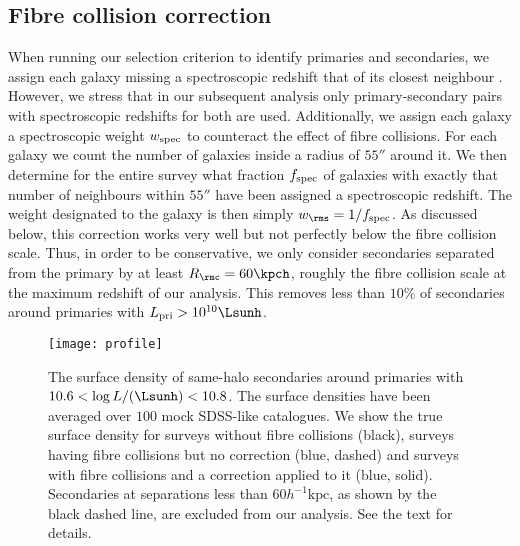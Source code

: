 \documentclass[fleqn,usenatbib,useAMS]{mnras}
\begin{document}
	\subsection{Fibre collision correction}
	\label{subsec:fibre_collisions}
	
	When running our selection criterion to identify primaries and secondaries, we assign each galaxy missing a spectroscopic redshift that of its closest neighbour \citep[see][]{Blanton+05, Zehavi+05}. However, we stress that in our subsequent analysis only primary-secondary pairs with spectroscopic redshifts for both are used. Additionally, we assign each galaxy a spectroscopic weight $w_{\rm spec}$ to counteract the effect of fibre collisions. For each galaxy we count the number of galaxies inside a radius of $55''$ around it. We then determine for the entire survey what fraction $f_{\rm spec}$ of galaxies with exactly that number of neighbours within $55''$ have been assigned a spectroscopic redshift. The weight designated to the galaxy is then simply $w_\rms = 1/f_{\rm spec}$. As discussed below, this correction works very well but not perfectly below the fibre collision scale. Thus, in order to be conservative, we only consider secondaries separated from the primary by at least $R_\rmc = 60 \kpch$, roughly the fibre collision scale at the maximum redshift of our analysis. This removes less than $10\%$ of secondaries around primaries with $L_{\rm pri} > 10^{10} \Lsunh$.
	\begin{figure}
		\centering
		\texttt{[image: profile]}
		\caption{The surface density of same-halo secondaries around primaries with $10.6 < \log L / (\Lsunh) < 10.8$. The surface densities have been averaged over $100$ mock SDSS-like catalogues. We show the true surface density for surveys without fibre collisions (black), surveys having fibre collisions but no correction (blue, dashed) and surveys with fibre collisions and a correction applied to it (blue, solid). Secondaries at separations less than $60 h^{-1} \mathrm{kpc}$, as shown by the black dashed line, are excluded from our analysis. See the text for details.}
		\label{fig:fiber_collision_profile}
	\end{figure}
	
\end{document}
